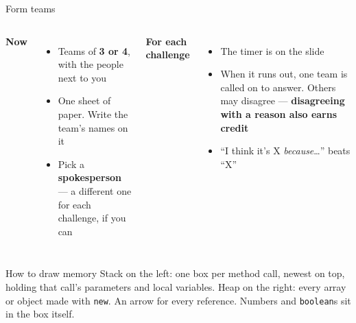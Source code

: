\documentclass[aspectratio=169]{beamer}
\newcommand{\code}[1]{\texttt{#1}}
\newcommand{\neutrallabel}[1]{\textcolor{bkblue}{\textbf{#1}}}
\begin{document}
\begin{frame}{Form teams}
  \begin{columns}[T,onlytextwidth]
    \neutrallabel{Now}
    \begin{itemize}[itemsep=0.3em]
      \item Teams of \textbf{3 or 4}, with the people next to you
      \item One sheet of paper. Write the team's names on it
      \item Pick a \textbf{spokesperson} --- a different one for each challenge, if you can
    \end{itemize}
    \neutrallabel{For each challenge}
    \begin{itemize}[itemsep=0.3em]
      \item The timer is on the slide
      \item When it runs out, one team is called on to answer. Others may disagree ---
        \textbf{disagreeing with a reason also earns credit}
      \item ``I think it's X \emph{because}\ldots'' beats ``X''
    \end{itemize}
  \end{columns}
  \vspace{0.6em}
  \begin{contextbox}{How to draw memory}
    \small Stack on the left: one box per method call, newest on top, holding that call's
    parameters and local variables. Heap on the right: every array or object made with
    \code{new}. An arrow for every reference. Numbers and \code{boolean}s sit in the box
    itself.
  \end{contextbox}
\end{frame}
\end{document}
